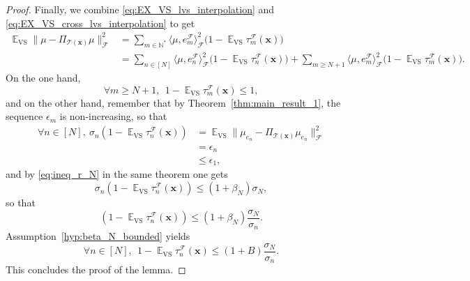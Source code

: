 \documentclass[twoside,11pt]{book}
\DeclareMathOperator{\VS}{\mathrm{VS}}
\DeclareMathOperator{\EX}{\mathbb{E}}
\DeclareMathOperator{\F}{\mathcal{F}}
\begin{document}
\begin{proof}
Finally, we combine \eqref{eq:EX_VS_lvs_interpolation} and \eqref{eq:EX_VS_cross_lvs_interpolation} to get
\begin{align}
\EX_{\VS}\|\mu - \Pi_{\mathcal{T}(\bm{x})} \mu\|_{\F}^{2} & = \sum\limits_{m \in \mathbb{N}^{*}} \langle \mu, e_{m}^{\F} \rangle_{\F}^{2}\bigg(1- \EX_{\VS}\tau_{m}^{\F}(\bm{x})\bigg) \nonumber\\
& = \sum\limits_{n \in [N]} \langle \mu, e_{n}^{\F} \rangle_{\F}^{2}\bigg(1- \EX_{\VS}\tau_{n}^{\F}(\bm{x})\bigg) + \sum\limits_{m \geq N+1} \langle \mu, e_{m}^{\F} \rangle_{\F}^{2}\bigg(1- \EX_{\VS}\tau_{m}^{\F}(\bm{x})\bigg).
\end{align}
On the one hand,
\begin{equation}
\forall m \geq N+1, \:\: 1- \EX_{\VS}\tau_{m}^{\F}(\bm{x}) \leq 1,
\end{equation}
and on the other hand, remember that by Theorem~\ref{thm:main_result_1}, the sequence $\epsilon_{m}$ is non-increasing, so that
\begin{align}
\forall n \in [N], \: \sigma_{n} (1-\EX_{\VS} \tau_{n}^{\F}(\bm{x})) & = \EX_{\VS} \|\mu_{e_{n}} - \Pi_{\mathcal{T}(\bm{x})} \mu_{e_{n}}\|_{\F}^{2} \\
& = \epsilon_{n} \\
& \leq \epsilon_{1},
\end{align}
and by \eqref{eq:ineq_r_N} in the same theorem one gets
\begin{equation}
\sigma_{n} (1-\EX_{\VS} \tau_{n}^{\F}(\bm{x})) \leq (1+\beta_{N}) \sigma_{N},
\end{equation}
so that
\begin{equation}
 (1-\EX_{\VS} \tau_{n}^{\F}(\bm{x})) \leq (1+\beta_{N})\frac{ \sigma_{N}}{\sigma_{n}}.
\end{equation}
Assumption~\ref{hyp:beta_N_bounded} yields \
\begin{equation}
\forall n \in [N],\:\: 1- \EX_{\VS}\tau_{n}^{\F}(\bm{x}) \leq  (1+B) \frac{\sigma_{N}}{\sigma_{n}}.
\end{equation}
This concludes the proof of the lemma.
\end{proof}
\end{document}
